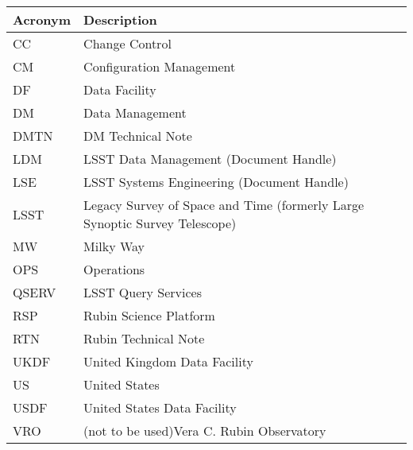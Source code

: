 \addtocounter{table}{-1}
\begin{longtable}{p{}p{}}\hline
\textbf{Acronym} & \textbf{Description}  \\\hline

CC & Change Control \\\hline
CM & Configuration Management \\\hline
DF & Data Facility \\\hline
DM & Data Management \\\hline
DMTN & DM Technical Note \\\hline
LDM & LSST Data Management (Document Handle) \\\hline
LSE & LSST Systems Engineering (Document Handle) \\\hline
LSST & Legacy Survey of Space and Time (formerly Large Synoptic Survey Telescope) \\\hline
MW & Milky Way \\\hline
OPS & Operations \\\hline
QSERV & LSST Query Services \\\hline
RSP & Rubin Science Platform \\\hline
RTN & Rubin Technical Note \\\hline
UKDF & United Kingdom Data Facility \\\hline
US & United States \\\hline
USDF & United States Data Facility \\\hline
VRO & (not to be used)Vera C. Rubin Observatory \\\hline
\end{longtable}
